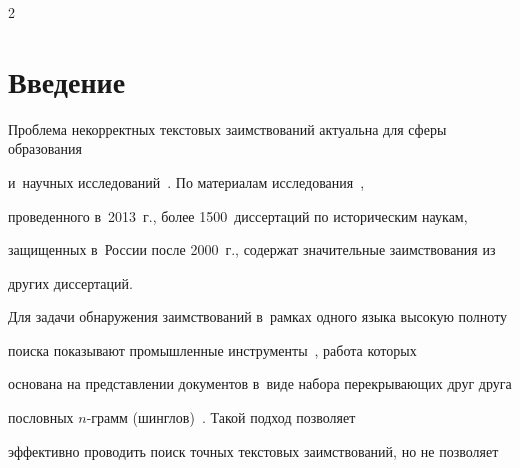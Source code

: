 

















\thispagestyle{headings}





\begin{multicols}{2}





\label{st\stat}





\section{Введение}





\vspace*{-2pt}





Проблема некорректных текстовых заимствований актуальна для сферы образования 


и~научных исследований~\cite{plag_cheh}. По материалам исследования~\cite{hist}, 


проведенного в~2013~г., более 1500~диссертаций по историческим наукам, 


защищенных в~России после 2000~г., содержат значительные заимствования из 


других диссертаций.





Для задачи обнаружения заимствований в~рамках одного языка высокую полноту 


поиска показывают промышленные инструменты~\cite{plag_cheh}, работа которых 


основана на представлении документов в~виде набора перекрывающих друг друга 


пословных $n$-грамм (шинглов)~\cite{shingles1}. Такой подход позволяет 


эффективно проводить поиск точных текстовых заимствований, но не позволяет 



\end{multicols}
